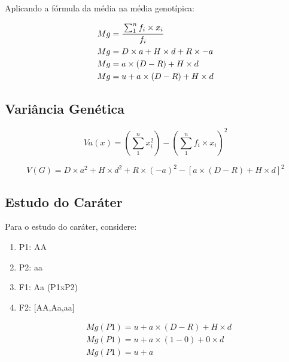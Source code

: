 Aplicando a fórmula da média na média genotípica:


\begin{definition}
\begin{align}
&  Mg = \cfrac{\sum_{1}^{n} f_i\times{x_i}}{f_i} \\
&  Mg = D\times a + H\times d + R \times -a \\
&  Mg  = a \times (D-R) + H\times d \\
&  Mg = u + a\times(D-R) + H\times d
\end{align}
\end{definition}


\subsection{Variância Genética}

\begin{equation}
Va(x) = (\sum_{1}^{n} x_i^2) - (\sum_{1}^{n} f_i\times x_i)^2
\end{equation}

\begin{equation}
V(G) = D \times a^2 + H \times d^2 + R \times (-a)^2 - [a \times (D - R) + H \times d]^2
\end{equation}

\subsection{Estudo do Caráter}

Para o estudo do caráter, considere:

\begin{enumerate}
\item P1: AA
\item P2: aa
\item F1: Aa (P1xP2)
\item F2: [AA,Aa,aa]
\end{enumerate}


 
\begin{definition}[Análise de P1]

\begin{align}
&  Mg(P1) = u + a \times (D-R) + H \times d\\
&  Mg(P1) = u + a \times (1-0) + 0 \times d\\
&  Mg(P1) = u + a \\
\end{align}
\end{definition}

